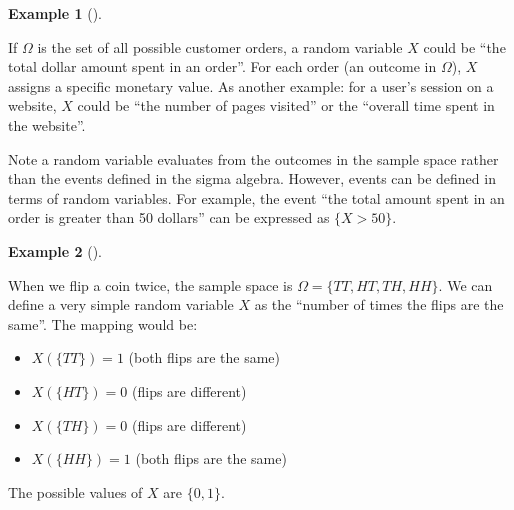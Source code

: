 \documentclass[
  letterpaper,
]{scrbook}
\providecommand{\tightlist}{%
  \setlength{\itemsep}{0pt}\setlength{\parskip}{0pt}}
\theoremstyle{definition}
\theoremstyle{plain}
\theoremstyle{plain}
\theoremstyle{definition}
\newtheorem{example}{Example}[chapter]
\theoremstyle{remark}
\begin{document}
\begin{tcolorbox}[enhanced jigsaw, bottomtitle=1mm, coltitle=black, toprule=.15mm, toptitle=1mm, bottomrule=.15mm, colback=white, arc=.35mm, opacityback=0, breakable, title={Random variable examples}, titlerule=0mm, rightrule=.15mm, colbacktitle=quarto-callout-note-color!10!white, colframe=quarto-callout-note-color-frame, opacitybacktitle=0.6, leftrule=.75mm, left=2mm]

\begin{example}[]\protect\hypertarget{exm-random-variable}{}\label{exm-random-variable}

If \(\Omega\) is the set of all possible customer orders, a random
variable \(X\) could be ``the total dollar amount spent in an order''.
For each order (an outcome in \(\Omega\)), \(X\) assigns a specific
monetary value. As another example: for a user's session on a website,
\(X\) could be ``the number of pages visited'' or the ``overall time
spent in the website''.

\end{example}

\end{tcolorbox}

Note a random variable evaluates from the outcomes in the sample space
rather than the events defined in the sigma algebra. However, events can
be defined in terms of random variables. For example, the event ``the
total amount spent in an order is greater than 50 dollars'' can be
expressed as \(\{X > 50\}\).

\begin{tcolorbox}[enhanced jigsaw, bottomtitle=1mm, coltitle=black, toprule=.15mm, toptitle=1mm, bottomrule=.15mm, colback=white, arc=.35mm, opacityback=0, breakable, title={Random variable: Number of equal coin flips}, titlerule=0mm, rightrule=.15mm, colbacktitle=quarto-callout-note-color!10!white, colframe=quarto-callout-note-color-frame, opacitybacktitle=0.6, leftrule=.75mm, left=2mm]

\begin{example}[]\protect\hypertarget{exm-random-variable-heads}{}\label{exm-random-variable-heads}

When we flip a coin twice, the sample space is
\(\Omega = \{TT, HT, TH, HH\}\). We can define a very simple random
variable \(X\) as the ``number of times the flips are the same''. The
mapping would be:

\begin{itemize}
\tightlist
\item
  \(X(\{TT\}) = 1\) (both flips are the same)
\item
  \(X(\{HT\}) = 0\) (flips are different)
\item
  \(X(\{TH\}) = 0\) (flips are different)
\item
  \(X(\{HH\}) = 1\) (both flips are the same)
\end{itemize}

The possible values of \(X\) are \(\{0, 1\}\).

\end{example}

\end{tcolorbox}
\end{document}

